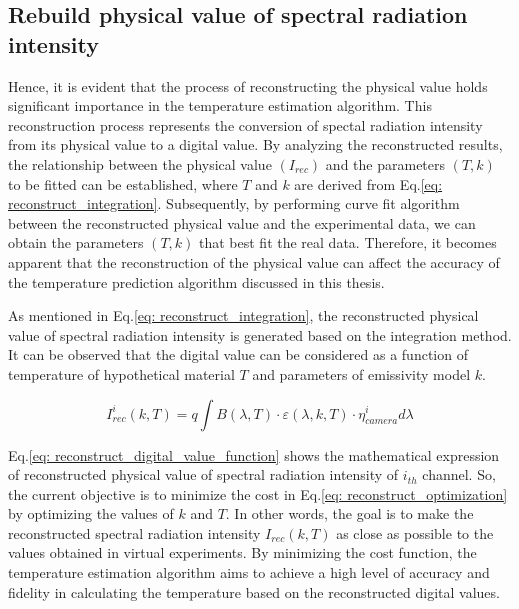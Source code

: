 \subsection{Rebuild physical value of spectral radiation intensity}
Hence, it is evident that the process of reconstructing the physical value holds 
significant importance in the temperature estimation algorithm. This reconstruction 
process represents the conversion of spectal radiation intensity from its physical value to a 
digital value. By analyzing the reconstructed results, the 
relationship between the physical value $(I_{rec})$ and the parameters $(T, k)$ to be fitted can be established, 
where $T$ and $k$ are derived from Eq.\ref{eq: reconstruct_integration}. Subsequently, 
by performing curve 
fit algorithm between the reconstructed physical value and the experimental data, we 
can obtain the parameters $(T, k)$ that best fit the real data. Therefore, it 
becomes apparent that the reconstruction of the physical value can affect 
the accuracy of the temperature prediction algorithm discussed in this thesis.


As mentioned in Eq.\ref{eq: reconstruct_integration}, the reconstructed physical value 
of spectral radiation intensity is generated based on the integration method. It can 
be observed that the digital value can be considered as a function of temperature of 
hypothetical material $T$ and parameters of emissivity model $k$.


\begin{equation}
  \label{eq: reconstruct_digital_value_function}
  I_{rec}^i (k, T) = q \int B(\lambda, T) \cdot \varepsilon(\lambda, k, T) 
  \cdot \eta_{camera}^i d\lambda
\end{equation}


Eq.\ref{eq: reconstruct_digital_value_function} shows the mathematical expression 
of reconstructed physical value of spectral radiation intensity of $i_{th}$ channel.
So, the current objective is to minimize the cost in Eq.\ref{eq: reconstruct_optimization} 
by optimizing the values of $k$ and $T$. In other words, the goal is to make the 
reconstructed spectral radiation intensity $I_{rec}(k, T)$ as close as possible 
to the values obtained in virtual experiments. By minimizing the cost function, 
the temperature estimation algorithm aims to achieve a high level of accuracy 
and fidelity in calculating the temperature based on the reconstructed 
digital values.


